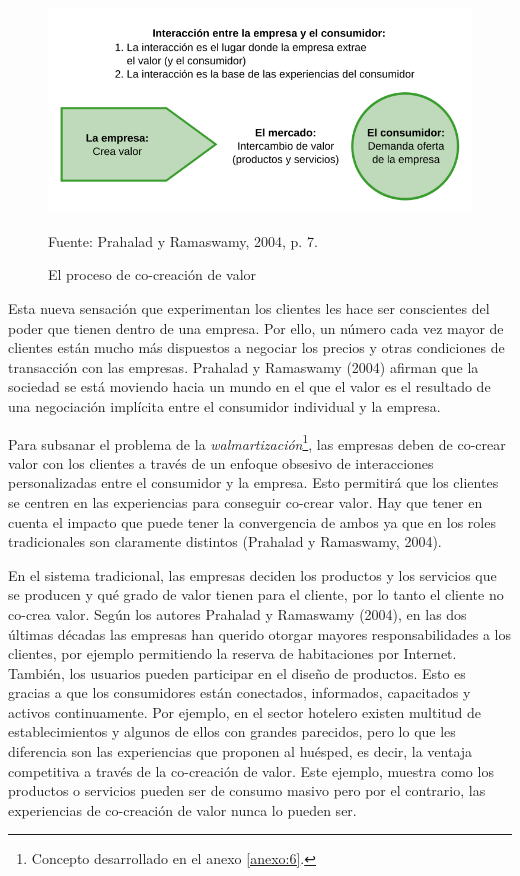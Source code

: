 \begin{figure}[!h]
	\caption{El proceso de co-creación de valor}
	\centering \includegraphics[width=140mm]{capitulos/graficos/interaccionPrahalad} 
	\label{fig:interaccionPrahalad} 

	\footnotesize
		Fuente: Prahalad y Ramaswamy, 2004, p. 7.
\end{figure}

Esta nueva sensación que experimentan los clientes les hace ser conscientes del poder que tienen dentro de una empresa. Por ello, un número cada vez mayor de clientes están mucho más dispuestos a negociar los precios y otras condiciones de transacción con las empresas. Prahalad y Ramaswamy (2004) afirman que la sociedad se está moviendo hacia un mundo en el que el valor es el resultado de una negociación implícita entre el consumidor individual y la empresa. 

Para subsanar el problema de la \emph{walmartización}\footnote{Concepto desarrollado en el anexo \ref{anexo:6}.}, las empresas deben de co-crear valor con los clientes a través de un enfoque obsesivo de interacciones personalizadas entre el consumidor y la empresa. Esto permitirá que los clientes se centren en las experiencias para conseguir co-crear valor. Hay que tener en cuenta el impacto que puede tener la convergencia de ambos ya que en los roles tradicionales son claramente distintos (Prahalad y Ramaswamy, 2004).

En el sistema tradicional, las empresas deciden los productos y los servicios que se producen y qué grado de valor tienen para el cliente, por lo tanto el cliente no co-crea valor. Según los autores Prahalad y Ramaswamy (2004), en las dos últimas décadas las empresas han querido otorgar mayores responsabilidades a los clientes, por ejemplo permitiendo la reserva de habitaciones por Internet. También, los usuarios pueden participar en el diseño de productos. Esto es gracias a que los consumidores están conectados, informados, capacitados y activos continuamente. Por ejemplo, en el sector hotelero existen multitud de establecimientos y algunos de ellos con grandes parecidos, pero lo que les diferencia son las experiencias que proponen al huésped, es decir, la ventaja competitiva a través de la co-creación de valor. Este ejemplo, muestra como los productos o servicios pueden ser de consumo masivo pero por el contrario, las experiencias de co-creación de valor nunca lo pueden ser. 

